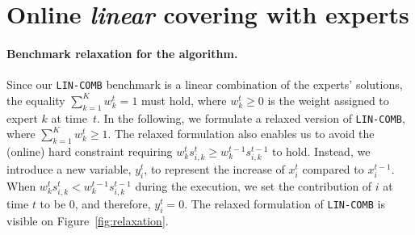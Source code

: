 
\section{Online \emph{linear} covering with experts}	\label{sec:covering}

\paragraph{Benchmark relaxation for the algorithm.}
%

Since our \texttt{LIN-COMB} benchmark is a linear combination of the experts' solutions, the equality $ \sum_{k=1}^{K} w_{k}^{t} = 1$ must hold, where $w_{k}^{t} \geq 0$ is the weight assigned to expert $k$ at time~$t$. In the following, we formulate a relaxed version of \texttt{LIN-COMB}, where
$\sum_{k=1}^{K} w_{k}^{t} \geq 1$. The relaxed formulation also enables us to avoid the (online) hard constraint requiring $w_{k}^{t} s_{i,k}^{t} \geq w_{k}^{t-1} s_{i,k}^{t-1}$ to hold. Instead, we introduce a new variable, $y_{i}^{t}$, to represent the increase of $x_{i}^{t}$ compared to $x_{i}^{t-1}$. When $w_{k}^{t} s_{i,k}^{t} < w_{k}^{t-1} s_{i,k}^{t-1}$ during the execution, we set the contribution of $i$ at time $t$ to be 0, and therefore, $y_{i}^{t} = 0$.
The relaxed formulation of \texttt{LIN-COMB} is visible on Figure~\ref{fig:relaxation}.

